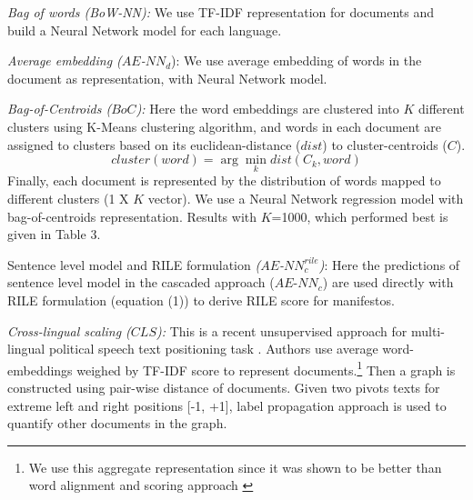 \documentclass[11pt,a4paper]{article}
\newcommand{\argmin}{\arg\!\min}
\begin{document}
\begin{description}
\item{\textit{Bag of words (BoW-NN):}} We use TF-IDF representation for documents and build a Neural Network model  for each language.
\item{\textit{Average embedding ($AE$-$NN_{d}$}):} We use average embedding of words in the document as representation, with Neural Network model.

\item{\textit{Bag-of-Centroids ($BoC$):}} Here the word embeddings are clustered into $K$ different clusters using K-Means clustering algorithm, and  words in each document are assigned to clusters based on its euclidean-distance ($dist$) to cluster-centroids ($C$). 
\[ cluster (word) = \argmin_k dist(C_{k}, word) \]
Finally, each document is represented by the distribution of words mapped to different clusters (1 X $K$ vector). We use a Neural Network regression model with bag-of-centroids representation. Results with $K$=1000, which performed best is given in Table 3.

\item{Sentence level model and RILE formulation \textit{($AE$-$NN_{c}^{rile}$)}:} Here the predictions of sentence level model in the cascaded approach ($AE$-$NN_{c}$) are used directly with RILE formulation (equation (1)) to derive RILE score for manifestos.

\item{\textit{Cross-lingual scaling ($CLS$):}} This is a recent unsupervised approach for multi-lingual political speech text positioning task \cite{EACL}. Authors use average word-embeddings weighed by TF-IDF score to represent documents.\footnote{We use this aggregate representation since it was shown to be better than word alignment and scoring approach \cite{EACL}} Then a graph is constructed using pair-wise distance of documents. Given two pivots texts for extreme left and right positions [-1, +1], label propagation approach is used to quantify other documents in the graph.
\end{description}
\end{document}
